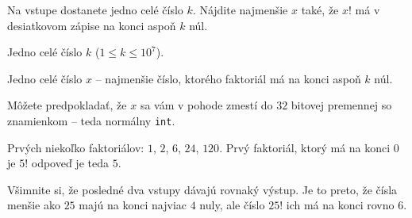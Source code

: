 




Na vstupe dostanete jedno celé číslo $k$. Nájdite najmenšie $x$ také, že $x!$ má v desiatkovom
zápise na konci aspoň $k$ núl.


Jedno celé číslo $k$ ($1 \leq k \leq 10^7$).


Jedno celé číslo $x$ -- najmenšie číslo, ktorého faktoriál má na konci aspoň $k$ núl.

Môžete predpokladať, že $x$ sa vám v pohode zmestí do $32$ bitovej premennej so znamienkom -- teda
normálny \texttt{int}.


\komentar
Prvých niekoľko faktoriálov: $1$, $2$, $6$, $24$, $120$. Prvý faktoriál, ktorý má na konci $0$ je
$5!$ odpoveď je teda $5$.
\koniec

\koniec

\komentar
Všimnite si, že posledné dva vstupy dávajú rovnaký výstup. Je to preto, že čísla menšie ako $25$
majú na konci najviac $4$ nuly, ale číslo $25!$ ich má na konci rovno $6$.
\koniec


